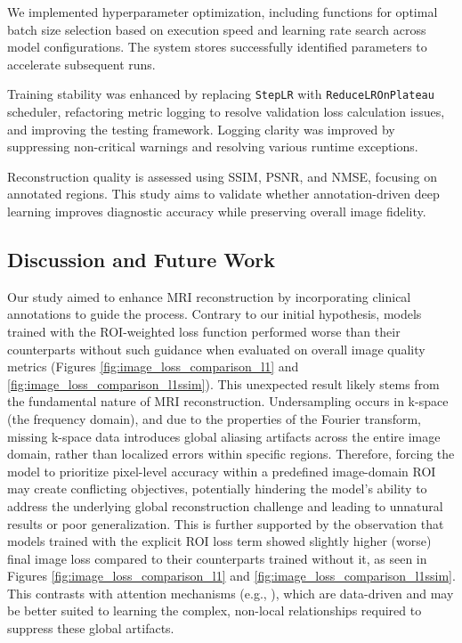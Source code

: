 \documentclass[
	letterpaper, %
]{jdf}
\begin{document}
We implemented hyperparameter optimization, including functions for optimal batch size selection based on execution speed and learning rate search across model configurations. The system stores successfully identified parameters to accelerate subsequent runs.

Training stability was enhanced by replacing \texttt{StepLR} with \texttt{ReduceLROnPlateau} scheduler, refactoring metric logging to resolve validation loss calculation issues, and improving the testing framework. Logging clarity was improved by suppressing non-critical warnings and resolving various runtime exceptions.

Reconstruction quality is assessed using SSIM, PSNR, and NMSE, focusing on annotated regions. This study aims to validate whether annotation-driven deep learning improves diagnostic accuracy while preserving overall image fidelity.


\subsection{Discussion and Future Work} %

Our study aimed to enhance MRI reconstruction by incorporating clinical annotations to guide the process. Contrary to our initial hypothesis, models trained with the ROI-weighted loss function performed worse than their counterparts without such guidance when evaluated on overall image quality metrics (Figures \ref{fig:image_loss_comparison_l1} and \ref{fig:image_loss_comparison_l1ssim}). This unexpected result likely stems from the fundamental nature of MRI reconstruction. Undersampling occurs in k-space (the frequency domain), and due to the properties of the Fourier transform, missing k-space data introduces global aliasing artifacts across the entire image domain, rather than localized errors within specific regions. Therefore, forcing the model to prioritize pixel-level accuracy within a predefined image-domain ROI may create conflicting objectives, potentially hindering the model's ability to address the underlying global reconstruction challenge and leading to unnatural results or poor generalization. This is further supported by the observation that models trained with the explicit ROI loss term showed slightly higher (worse) final image loss compared to their counterparts trained without it, as seen in Figures \ref{fig:image_loss_comparison_l1} and \ref{fig:image_loss_comparison_l1ssim}. This contrasts with attention mechanisms (e.g., \cite{att_is}), which are data-driven and may be better suited to learning the complex, non-local relationships required to suppress these global artifacts.
\end{document}
